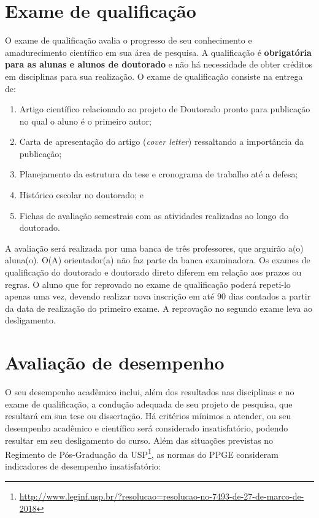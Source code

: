 \documentclass[twoside a4paper 12pt]{report}
\begin{document}
\section{Exame de qualificação}
\label{sec:qualif}

O exame de qualificação avalia o progresso de seu conhecimento e amadurecimento científico em sua área de pesquisa. A qualificação é \textbf{obrigatória} \textbf{para as alunas e alunos de doutorado} e não há necessidade de obter créditos em disciplinas para sua realização. O exame de qualificação consiste na entrega de: 
\begin{enumerate}
\item Artigo científico relacionado ao projeto de Doutorado pronto para publicação no qual o aluno é o primeiro autor;
\item Carta de apresentação do artigo (\emph{cover letter}) ressaltando a importância da publicação; 
\item Planejamento da estrutura da tese e cronograma de trabalho até a defesa;
\item Histórico escolar no doutorado; e 
\item Fichas de avaliação semestrais com as atividades realizadas ao longo do doutorado.
\end{enumerate}

A avaliação será realizada por uma banca de três professores, que
arguirão a(o) aluna(o). O(A) orientador(a) não faz parte da banca
examinadora. Os exames de qualificação do doutorado e doutorado direto
diferem em relação aos prazos ou regras. O aluno que for reprovado no
exame de qualificação poderá repeti-lo apenas uma vez, devendo
realizar nova inscrição em até 90 dias contados a partir da data de
realização do primeiro exame. A reprovação no segundo exame leva ao
desligamento.


\section{Avaliação de desempenho}
\label{sec:conduta}

O seu desempenho acadêmico inclui, além dos resultados nas disciplinas
e no exame de qualificação, a condução adequada de seu projeto de
pesquisa, que resultará em sua tese ou dissertação. Há critérios
mínimos a atender, ou seu desempenho acadêmico e científico será
considerado insatisfatório, podendo resultar em seu desligamento do
curso. Além das situações previstas no Regimento de Pós-Graduação da
USP\footnote{\url{http://www.leginf.usp.br/?resolucao=resolucao-no-7493-de-27-de-marco-de-2018}},
as normas do PPGE consideram indicadores de desempenho insatisfatório:
\end{document}
